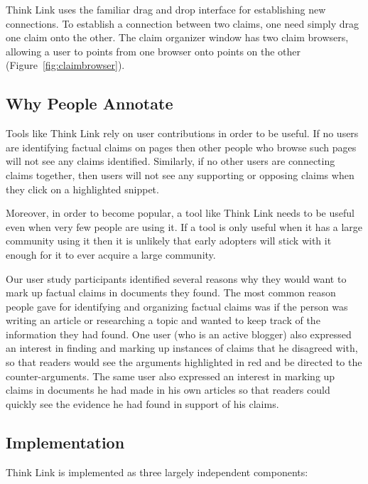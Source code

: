 \documentclass{chi2009}
\begin{document}
Think Link uses the familiar drag and drop interface for establishing new connections. To establish a connection between two claims, one need simply drag one claim onto the other. The claim organizer window has two claim browsers, allowing a user to points from one browser onto points on the other (Figure~\ref{fig:claimbrowser}).


\subsection{Why People Annotate}

Tools like Think Link rely on user contributions in order to be useful. If no users are identifying factual claims on pages then other people who browse such pages will not see any claims identified. Similarly, if no other users are connecting claims together, then users will not see any supporting or opposing claims when they click on a highlighted snippet.

Moreover, in order to become popular, a tool like Think Link needs to be useful even when very few people are using it. If a tool is only useful when it has a large community using it then it is unlikely that early adopters will stick with it enough for it to ever acquire a large community.

Our user study participants identified several reasons why they would want to mark up factual claims in documents they found. The most common reason people gave for identifying and organizing factual claims was if the person was writing an article or researching a topic and wanted to keep track of the information they had found. One user (who is an active blogger) also expressed an interest in finding and marking up instances of claims that he disagreed with, so that readers would see the arguments highlighted in red and be directed to the counter-arguments. The same user also expressed an interest in marking up claims in documents he had made in his own articles so that readers could quickly see the evidence he had found in support of his claims.


\subsection{Implementation}

Think Link is implemented as three largely independent components:
\end{document}
